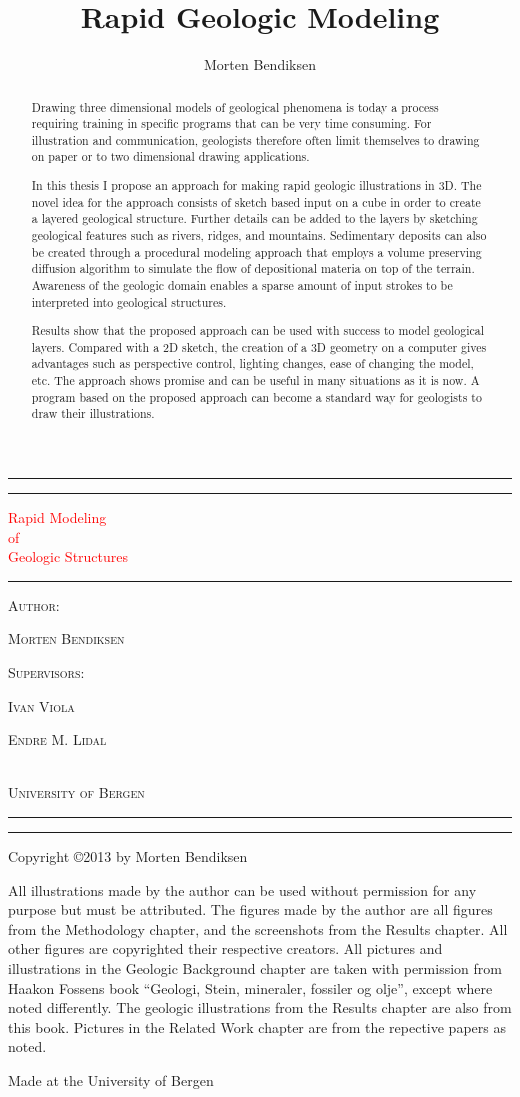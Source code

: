 \documentclass[a4paper,12pt]{report}
\title{Rapid Geologic Modeling}
\author{Morten Bendiksen}
\newcommand*{\plogo}{\fbox{$\mathcal{PL}$}} %
\newcommand*{\titleAT}{\begingroup %
\newlength{\drop} %
\drop=0.1\textheight %

\rule{\textwidth}{1pt}\par %
\vspace{2pt}\vspace{-\baselineskip} %
\rule{\textwidth}{0.4pt}\par %

\vspace{\drop} %
\centering %
\textcolor{Red}{ %
{\Huge Rapid Modeling}\\[0.5\baselineskip] %
{\Large of}\\[0.75\baselineskip] %
{\Huge Geologic Structures}} %

\vspace{0.25\drop} %
\rule{0.3\textwidth}{0.4pt}\par %
\vspace{\drop} %


{ \textsc{Author:}}\par %
{\Large \textsc{Morten Bendiksen}}\par %
\vspace{\drop}
\vspace{\drop}
{ \textsc{Supervisors:}}\par %
{\Large \textsc{Ivan Viola}}\par %
{\Large \textsc{Endre M. Lidal}}\par %

\vfill %
{\large \textcolor{Red}{\plogo}}\\[0.5\baselineskip] %
{\large \textsc{University of Bergen}}\par %

\vspace*{\drop} %

\rule{\textwidth}{0.4pt}\par %
\vspace{2pt}\vspace{-\baselineskip} %
\rule{\textwidth}{1pt}\par %

\endgroup}
\begin{document}
\titleAT


\clearpage
\begin{abstract}
Drawing three dimensional models of geological phenomena is today a process requiring training in specific programs that can be very time consuming. For illustration and communication, geologists therefore often limit themselves to drawing on paper or to two dimensional drawing applications.

In this thesis I propose an approach for making rapid geologic illustrations in 3D. The novel idea for the approach consists of sketch based input on a cube in order to create a layered geological structure. Further details can be added to the layers by sketching geological features such as rivers, ridges, and mountains. Sedimentary deposits can also be created through a procedural modeling approach that employs a volume preserving diffusion algorithm to simulate the flow of depositional materia on top of the terrain. Awareness of the geologic domain enables a sparse amount of input strokes to be interpreted into geological structures. 

Results show that the proposed approach can be used with success to model geological layers. Compared with a 2D sketch, the creation of a 3D geometry on a computer gives advantages such as perspective control, lighting changes, ease of changing the model, etc. The approach shows promise and can be useful in many situations as it is now. A program based on the proposed approach can become a standard way for geologists to draw their illustrations.
\end{abstract}

\clearpage
\null\vfill 
\pagestyle{empty}
\begin{minipage}[b]{0.9\textwidth}
\footnotesize\raggedright
\setlength{\parskip}{0.5\baselineskip}
Copyright \copyright 2013 by Morten Bendiksen\par

All illustrations made by the author can be used without permission for any purpose but must be attributed. The figures made by the author are all figures from the Methodology chapter, and the screenshots from the Results chapter. All other figures are copyrighted their respective creators. All pictures and illustrations in the Geologic Background chapter are taken with permission from Haakon Fossens book ``Geologi, Stein, mineraler, fossiler og olje'', except where noted differently. The geologic illustrations from the Results chapter are also from this book. Pictures in the Related Work chapter are from the repective papers as noted. 

Made at the University of Bergen

\end{minipage}
\end{document}
